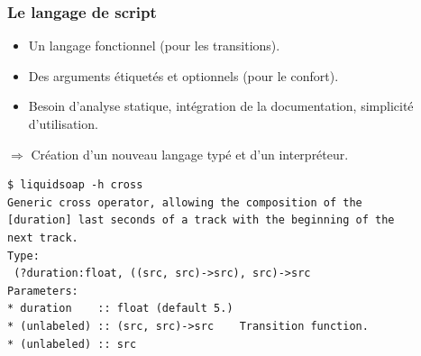 \documentclass{beamer}
\begin{document}
\begin{frame}[fragile]
\frametitle{Le langage de script}

\begin{itemize}
\item Un langage fonctionnel (pour les transitions).
\item Des arguments étiquetés et optionnels (pour le confort).
\item Besoin d'analyse statique, intégration de la documentation, simplicité
  d'utilisation.
\end{itemize}
$\Rightarrow$ Création d'un nouveau langage typé et d'un interpréteur.

\bigskip

{\small
\begin{verbatim}
$ liquidsoap -h cross
Generic cross operator, allowing the composition of the
[duration] last seconds of a track with the beginning of the
next track.
Type:
 (?duration:float, ((src, src)->src), src)->src
Parameters:
* duration    :: float (default 5.)
* (unlabeled) :: (src, src)->src    Transition function.
* (unlabeled) :: src
\end{verbatim}}
\end{frame}
\end{document}
